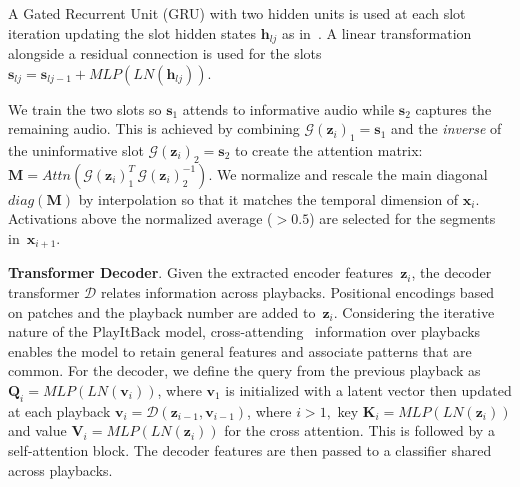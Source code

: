 \documentclass{article}
\begin{document}
\noindent
A Gated Recurrent Unit (GRU) with two hidden units is used at each slot iteration updating the slot hidden states $\mathbf{h}_{lj}$ as in~\cite{locatello2020object}. A linear transformation alongside a residual connection is used for the slots $\mathbf{s}_{lj} \! = \! \mathbf{s}_{lj-1} \! + \! MLP(LN(\mathbf{h}_{lj}))$. 

We train the two slots so $\mathbf{s}_1$ attends to informative audio while $\mathbf{s}_2$ captures the remaining audio.
This is achieved by combining $\mathcal{G}(\mathbf{z}_{i})_{1}\! = \! \mathbf{s}_{1}$ and the \emph{inverse} of the uninformative slot $\mathcal{G}(\mathbf{z}_{i})_{2} \! = \! \mathbf{s}_{2}$ to create the attention matrix: ${\mathbf{M} \! = \! Attn(\mathcal{G}(\mathbf{z}_{i})_{1}^{T} \, \mathcal{G}(\mathbf{z}_{i})_{2}^{-1})}$. We normalize and rescale the main diagonal $diag(\mathbf{M})$ by interpolation so that it matches the temporal dimension of $\mathbf{x}_i$. Activations above the normalized average ($> \! 0.5$) are selected for the segments in~$\mathbf{x}_{i+1}$.



\noindent
\textbf{Transformer Decoder}. Given the extracted encoder features~$\mathbf{z}_i$, the decoder transformer $\mathcal{D}$ relates information across playbacks. Positional encodings based on patches and the playback number are added to~$\mathbf{z}_i$. Considering the iterative nature of the PlayItBack model, cross-attending~\cite{jaegle2021perceiver} information over playbacks enables the model to retain general features and associate patterns that are common. For the decoder, 
we define the query from the previous playback as $\mathbf{Q}_{i} \! = \! MLP(LN(\mathbf{v}_i))$, where $\textbf{v}_1$ is initialized with a latent vector then updated at each playback $\textbf{v}_{i} = \mathcal{D}(\textbf{z}_{i-1}, \textbf{v}_{i-1})$, where $i > 1,$ 
key $\mathbf{K}_{i} = MLP(LN(\textbf{z}_i))$ and value $\mathbf{V}_{i} = MLP(LN(\textbf{z}_i))$ for the cross attention. This is followed by a self-attention block. The decoder features are then passed to a classifier shared across playbacks.
\end{document}
